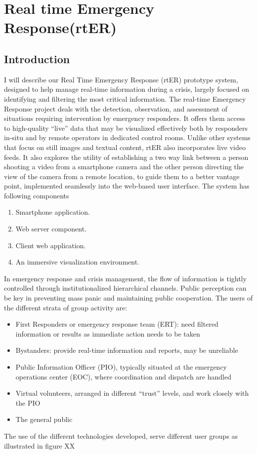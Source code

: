 \chapter{Real time Emergency Response(rtER) }
\label{chap:figtab}

\section{Introduction}

I will describe our Real Time Emergency Response (rtER) prototype system, designed to help manage real-time information during a crisis, largely focused on identifying and filtering the most critical information. The real-time Emergency Response project deals with the detection, observation, and assessment of situations requiring intervention by emergency responders. It offers them access to high-quality “live'' data that may be visualized effectively both by responders in-situ and by remote operators in dedicated control rooms.
Unlike other systems that focus on still images and textual content, rtER also incorporates
live video feeds. It also explores the utility of establishing a two way link between a person shooting a video from a smartphone camera and the other person directing the view of the camera from a remote location, to guide them to a better vantage point, implemented seamlessly into the web-based
user interface. The system has following components
\begin{enumerate}
	\item Smartphone application.
	\item Web server component.
	\item Client web application.
	\item An immersive visualization environment.
\end{enumerate}

In emergency response and crisis management, the flow of information is tightly controlled through institutionalized hierarchical channels. Public perception can be key in preventing mass panic and maintaining public cooperation. The users of the different strata of group activity are:
\begin{itemize}
\item First Responders or emergency response team (ERT): need filtered information or results as immediate action needs to be taken
\item Bystanders: provide real-time information and reports, may be unreliable 
\item Public Information Officer (PIO), typically situated at the emergency operations center (EOC), where coordination and dispatch are handled   
\item Virtual volunteers, arranged in different “trust” levels, and work closely with the PIO
\item The general public
\end{itemize}
The use of the different technologies developed, serve different user groups as illustrated in figure XX

